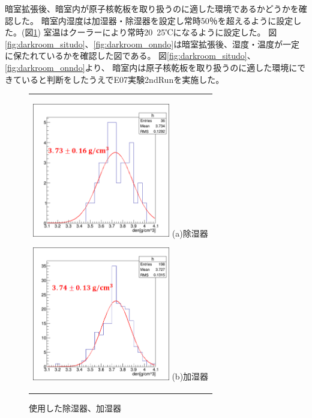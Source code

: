 \documentclass[12pt,a4paper]{jarticle}
\begin{document}
\par
暗室拡張後、暗室内が原子核乾板を取り扱うのに適した環境であるかどうかを確認した。
暗室内湿度は加湿器・除湿器を設定し常時50％を超えるように設定した。(図\ref{fig:kasituki_zyosituki})
室温はクーラーにより常時20~25℃になるように設定した。
図\ref{fig:darkroom_situdo}、\ref{fig:darkroom_onndo}は暗室拡張後、湿度・温度が一定に保たれているかを確認した図である。
図\ref{fig:darkroom_situdo}、\ref{fig:darkroom_onndo}より、
暗室内は原子核乾板を取り扱うのに適した環境にできていると判断をしたうえでE07実験2ndRunを実施した。
\begin{figure}[htbp]
  \centering
      \begin{tabular}{c}
        \begin{minipage}{0.5\hsize}
          \centering
            \includegraphics[clip, width=60mm]{1stRun_thin_den.png}
            \hspace{1.6cm} (a)除湿器
        \end{minipage}
        
        \begin{minipage}{0.5\hsize}
          \centering
            \includegraphics[clip, width=60mm]{2ndRun_thin_den.png}
            \hspace{1.6cm} (b)加湿器
        \end{minipage}
    
      \end{tabular}
      \caption{使用した除湿器、加湿器\label{fig:kasituki_zyosituki}}
\end{figure}
\end{document}
